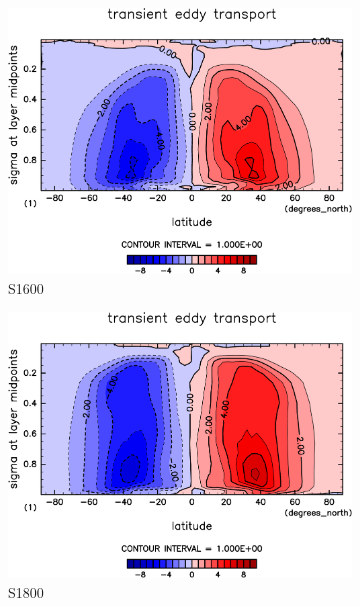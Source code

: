 \documentclass[body]{subfiles}
\begin{document}
\begin{figure}[t]
\begin{subfigure}{.4\textwidth}
		\centering
		\includegraphics[width=\columnwidth]{S1600/MeriHeatTransTest@latentEn_TE,time=3650:4015-crop-rotate.pdf}
		\caption{S1600}\label{潜熱移動性擾乱S1600}
	\end{subfigure}
	\begin{subfigure}{.4\textwidth}
		\centering
		\includegraphics[width=\columnwidth]{S1800/MeriHeatTransTest@latentEn_TE,time=3650:4015-crop-rotate.pdf}
		\caption{S1800}\label{潜熱移動性擾乱S1800}
	\end{subfigure}
	\begin{subfigure}{.4\textwidth}
		\centering

\end{subfigure}
\end{figure}
\end{document}
